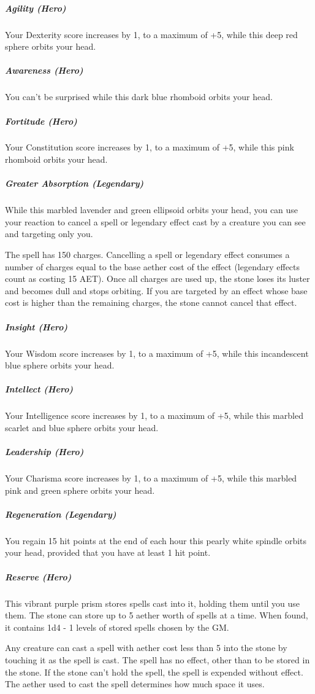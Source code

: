 \subparagraph*{Agility (Hero)} Your Dexterity score increases by 1, to a maximum of +5, while this deep red sphere orbits your head.

\subparagraph*{Awareness (Hero)} You can't be surprised while this dark blue rhomboid orbits your head.

\subparagraph*{Fortitude (Hero)} Your Constitution score increases by 1, to a maximum of +5, while this pink rhomboid orbits your head.

\subparagraph*{Greater Absorption (Legendary)} While this marbled lavender and green ellipsoid orbits your head, you can use your reaction to cancel a spell or legendary effect cast by a creature you can see and targeting only you.

The spell has 150 charges. Cancelling a spell or legendary effect consumes a number of charges equal to the base aether cost of the effect (legendary effects count as costing 15 AET). Once all charges are used up, the stone loses its luster and becomes dull and stops orbiting. If you are targeted by an effect whose base cost is higher than the remaining charges, the stone cannot cancel that effect.

\subparagraph*{Insight (Hero)} Your Wisdom score increases by 1, to a maximum of +5, while this incandescent blue sphere orbits your head.

\subparagraph*{Intellect (Hero)} Your Intelligence score increases by 1, to a maximum of +5, while this marbled scarlet and blue sphere orbits your head.

\subparagraph*{Leadership (Hero)} Your Charisma score increases by 1, to a maximum of +5, while this marbled pink and green sphere orbits your head.

\subparagraph*{Regeneration (Legendary)} You regain 15 hit points at the end of each hour this pearly white spindle orbits your head, provided that you have at least 1 hit point.

\subparagraph*{Reserve (Hero)} This vibrant purple prism stores spells cast into it, holding them until you use them. The stone can store up to 5 aether worth of spells at a time. When found, it contains 1d4 - 1 levels of stored spells chosen by the GM.

Any creature can cast a spell with aether cost less than 5 into the stone by touching it as the spell is cast. The spell has no effect, other than to be stored in the stone. If the stone can't hold the spell, the spell is expended without effect. The aether used to cast the spell determines how much space it uses.

